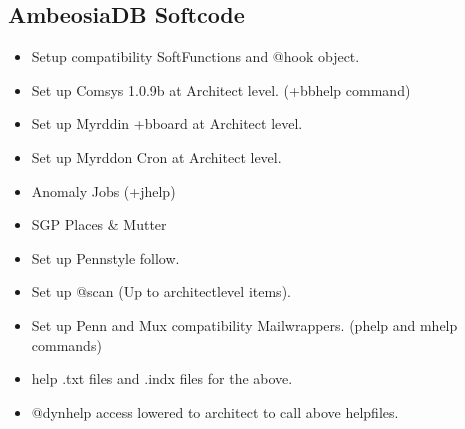\documentclass[letterpaper,10pt,english]{sphinxmanual}
\begin{document}
\subsection{AmbeosiaDB Softcode}
\label{\detokenize{ambrosiadb:ambeosiadb-softcode}}\begin{itemize}
\item {} 
\sphinxAtStartPar
Set\sphinxhyphen{}up compatibility SoftFunctions and @hook object.

\item {} 
\sphinxAtStartPar
Set up Comsys 1.0.9b at Architect level. (+bbhelp command)

\item {} 
\sphinxAtStartPar
Set up Myrddin +bboard at Architect level.

\item {} 
\sphinxAtStartPar
Set up Myrddon Cron at Architect level.

\item {} 
\sphinxAtStartPar
Anomaly Jobs (+jhelp)

\item {} 
\sphinxAtStartPar
SGP Places \& Mutter

\item {} 
\sphinxAtStartPar
Set up Penn\sphinxhyphen{}style follow.

\item {} 
\sphinxAtStartPar
Set up @scan (Up to architect\sphinxhyphen{}level items).

\item {} 
\sphinxAtStartPar
Set up Penn\sphinxhyphen{} and Mux compatibility Mailwrappers. (phelp and mhelp commands)

\item {} 
\sphinxAtStartPar
help .txt files and .indx files for the above.

\item {} 
\sphinxAtStartPar
@dynhelp access lowered to architect to call above helpfiles.

\end{itemize}
\end{document}
